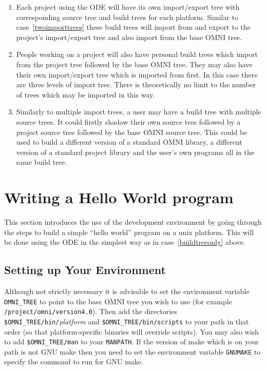 \documentclass[11pt]{article}
\begin{document}
\begin{enumerate}
\item Each project using the ODE will have its own import/export tree with
corresponding source tree and build trees for each platform.  Similar to
case~\ref{twoimporttrees} these build trees will import from and export to the
project's import/export tree and also import from the base OMNI tree.

\item People working on a project will also have personal build trees which
import from the project tree followed by the base OMNI tree.  They may also
have their own import/export tree which is imported from first.  In this case
there are three levels of import tree.  There is theoretically no limit to the
number of trees which may be imported in this way.

\item Similarly to multiple import trees, a user may have a build tree with
multiple source trees.  It could firstly shadow their own source tree followed
by a project source tree followed by the base OMNI source tree.  This could be
used to build a different version of a standard OMNI library, a different
version of a standard project library and the user's own programs all in the
same build tree.

\end{enumerate}

\section{Writing a Hello World program}

This section introduces the use of the development environment by going through
the steps to build a simple ``hello world'' program on a unix platform.  This
will be done using the ODE in the simplest way as in case~\ref{buildtreeonly}
above.

\subsection{Setting up Your Environment}

Although not strictly necessary it is advisable to set the environment variable
{\tt OMNI\_TREE} to point to the base OMNI tree you wish to use (for example
{\tt /project/omni/version4.0}).  Then add the directories {\tt
\$OMNI\_TREE/bin/}{\it platform} and {\tt \$OMNI\_TREE/bin/scripts} to your
path in that order (so that platform-specific binaries will override scripts).
You may also wish to add {\tt \$OMNI\_TREE/man} to your {\tt MANPATH}.  If the
version of make which is on your path is not GNU make then you need to set the
environment variable {\tt GNUMAKE} to specify the command to run for GNU make.
\end{document}
